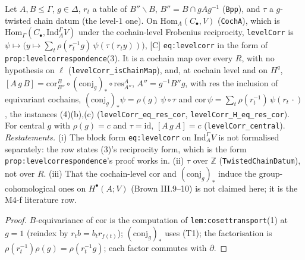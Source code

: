 \begin{proposition}\label{prop:levelcorrespondence-model}
  \leanok
  Let $A,B\le\Gamma$, $g\in\Delta$, $r_t$ a table of $B''\backslash B$, $B''=B\cap gAg^{-1}$ (\texttt{Bpp}), and $\tau$ a $g$-twisted
  chain datum (the level-$1$ one). On $\mathrm{Hom}_A(C_\bullet,V)$ (\texttt{CochA}), which is $\mathrm{Hom}_\Gamma(C_\bullet,
  \mathrm{Ind}_A^\Gamma V)$ under the cochain-level Frobenius reciprocity, \texttt{levelCorr} is
  $\psi\mapsto\bigl(y\mapsto\sum_t\rho(r_t^{-1}g)\,\psi(\tau(r_ty))\bigr)$, [C] \texttt{eq:levelcorr} in the form of
  \texttt{prop:levelcorrespondence}(3). It is a cochain map over every $R$, with no hypothesis on $\ell$ (\texttt{levelCorr\_isChainMap}),
  and, at cochain level and on $H^q$, $[A\,g\,B]=\mathrm{cor}^{B}_{B''}\circ(\mathrm{conj}_g)_*\circ\mathrm{res}^{A}_{A''}$,
  $A''=g^{-1}B''g$, with $\mathrm{res}$ the inclusion of equivariant cochains, $(\mathrm{conj}_g)_*\psi=\rho(g)\,\psi\circ\tau$ and
  $\mathrm{cor}\,\psi=\sum_t\rho(r_t^{-1})\,\psi(r_t\,\cdot)$, the instances (4)(b),(c) (\texttt{levelCorr\_eq\_res\_cor},
  \texttt{levelCorr\_H\_eq\_res\_cor}). For central $g$ with $\rho(g)=c$ and $\tau=\mathrm{id}$, $[A\,g\,A]=c$ (\texttt{levelCorr\_central}).
  \emph{Restatements.} (i) The block form \texttt{eq:levelcorr} on $\mathrm{Ind}_A^\Gamma V$ is not formalised separately: the row
  states (3)'s reciprocity form, which is the form \texttt{prop:levelcorrespondence}'s proof works in. (ii) $\tau$ over $\mathbb Z$
  (\texttt{TwistedChainDatum}), not over $R$. (iii) That the cochain-level $\mathrm{cor}$ and $(\mathrm{conj}_g)_*$ induce the
  group-cohomological ones on $H^\bullet(A;V)$ (Brown III.9--10) is not claimed here; it is the M4-f literature row.
\end{proposition}
\begin{proof}
  \leanok
  $B$-equivariance of $\mathrm{cor}$ is the computation of \texttt{lem:cosettransport}(1) at $g=1$ (reindex by $r_tb=b_tr_{f(t)}$);
  $(\mathrm{conj}_g)_*$ uses (T1); the factorisation is $\rho(r_t^{-1})\rho(g)=\rho(r_t^{-1}g)$; each factor commutes with $\partial$.
\end{proof}

